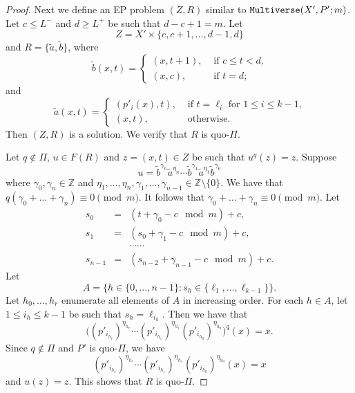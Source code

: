 \documentclass[11pt]{amsart}
\theoremstyle{definition}
\theoremstyle{definition}
\numberwithin{equation}{section}
\begin{document}
\begin{proof}
Next we define an EP problem $(Z, R)$ similar to $\mbox{\tt Multiverse}(X', P';m)$. Let $c\leq L^-$ and $d\geq L^+$ be such that $d-c+1=m$. Let $$Z=X'\times \{c, c+1,\dots, d-1, d\}$$ and $R=\{\tilde{a}, \tilde{b}\}$, where
$$ \tilde{b}(x, t)=\left\{\begin{array}{ll} (x, t+1), & \mbox{ if $c\leq t<d$,} \\
(x, c), & \mbox{ if $t=d$;}\end{array}\right.
$$
and
$$ \tilde{a}(x, t)=\left\{\begin{array}{ll} (p'_i(x), t), & \mbox{ if $t=\ell_i$ for $1\leq i\leq k-1$,} \\
(x, t), & \mbox{ otherwise.}
\end{array}\right.
$$
Then $(Z,R)$ is a solution. We verify that $R$ is quo-$\Pi$. 

Let $q\not\in\Pi$, $u\in F(R)$ and $z=(x, t)\in Z$ be such that $u^q(z)=z$. Suppose 
$$ u=\tilde{b}^{\gamma_n}\tilde{a}^{\eta_n}\cdots \tilde{b}^{\gamma_1}\tilde{a}^{\eta_1}\tilde{b}^{\gamma_0} $$
where $\gamma_0, \gamma_n\in\mathbb{Z}$ and $\eta_1, \dots, \eta_n, \gamma_1,\dots, \gamma_{n-1}\in \mathbb{Z}\setminus\{0\}$. We have that $q(\gamma_0+\dots+\gamma_n)\equiv 0\pmod{m}$. It follows that $\gamma_0+\dots+\gamma_n\equiv 0\pmod{m}$. Let 
$$\begin{array}{rcl} s_0&=&(t+\gamma_0-c\!\!\!\!\mod m)+c, \\
s_1&=&(s_0+\gamma_1-c\!\!\!\!\mod m)+c,  \\
&&\cdots\cdots \\
s_{n-1}&=&(s_{n-2}+\gamma_{n-1}-c\!\!\!\!\mod m)+c. 
\end{array}$$
Let 
$$ A=\big\{ h\in\{0,\dots, n-1\}\colon s_h\in\{\ell_1,\dots, \ell_{k-1}\}\big\}. $$
Let $h_0,\dots,h_r$ enumerate all elements of $A$ in increasing order. For each $h\in A$, let $1\leq i_h\leq k-1$ be such that $s_h=\ell_{i_h}$. Then we have that
$$ \big({(p'_{i_{h_r}})}^{\eta_{h_r}}\cdots {(p'_{i_{h_1}})}^{\eta_{h_1}}{(p'_{i_{h_0}})}^{\eta_{h_0}}\big)^q(x)=x. $$
Since $q\not\in\Pi$ and $P'$ is quo-$\Pi$, we have
$$ {(p'_{i_{h_r}})}^{\eta_{h_r}}\cdots {(p'_{i_{h_1}})}^{\eta_{h_1}}{(p'_{i_{h_0}})}^{\eta_{h_0}}(x)=x $$
and $u(z)=z$. This shows that $R$ is quo-$\Pi$.


\end{proof}
\end{document}
